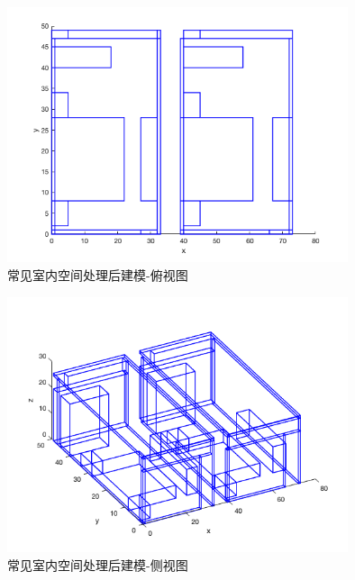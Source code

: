 \begin{figure}[htb]
    \centering
    \caption{常见室内空间处理后建模-俯视图}
    \label{fig:test_common_situation_processed_pic_top}
    \includegraphics[width=10cm]{figures/test_complex_situation_pic_top.png}
\end{figure}
\begin{figure}[htb]
    \centering
    \caption{常见室内空间处理后建模-侧视图}
    \label{fig:test_common_situation_processed_pic_lean}
    \includegraphics[width=10cm]{figures/test_complex_situation_pic_lean.png}
\end{figure}
